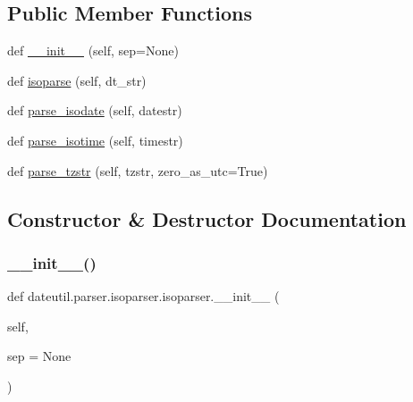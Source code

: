\subsection*{Public Member Functions}
\begin{DoxyCompactItemize}
\item 
def \hyperlink{classdateutil_1_1parser_1_1isoparser_1_1isoparser_a5d9340d2c6e64002c6dff3d38e58199e}{\+\_\+\+\_\+init\+\_\+\+\_\+} (self, sep=None)
\item 
def \hyperlink{classdateutil_1_1parser_1_1isoparser_1_1isoparser_a889eb130ffc9ff3d4f48f5cc95f15086}{isoparse} (self, dt\+\_\+str)
\item 
def \hyperlink{classdateutil_1_1parser_1_1isoparser_1_1isoparser_a6e3ce4026ea3f121e5d6cd53828bddb0}{parse\+\_\+isodate} (self, datestr)
\item 
def \hyperlink{classdateutil_1_1parser_1_1isoparser_1_1isoparser_a6a560abb35a58b5f799a3be3137e9df6}{parse\+\_\+isotime} (self, timestr)
\item 
def \hyperlink{classdateutil_1_1parser_1_1isoparser_1_1isoparser_a8448ea237a4899b104ce6c7adb6564da}{parse\+\_\+tzstr} (self, tzstr, zero\+\_\+as\+\_\+utc=True)
\end{DoxyCompactItemize}


\subsection{Constructor \& Destructor Documentation}
\mbox{\label{classdateutil_1_1parser_1_1isoparser_1_1isoparser_a5d9340d2c6e64002c6dff3d38e58199e}} 
\subsubsection{\texorpdfstring{\+\_\+\+\_\+init\+\_\+\+\_\+()}{\_\_init\_\_()}}
{\footnotesize\ttfamily def dateutil.\+parser.\+isoparser.\+isoparser.\+\_\+\+\_\+init\+\_\+\+\_\+ (\begin{DoxyParamCaption}\item[{}]{self,  }\item[{}]{sep = {\ttfamily None} }\end{DoxyParamCaption})}


